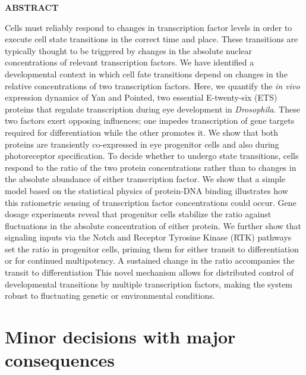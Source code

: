 

\textbf{ABSTRACT}

Cells must reliably respond to changes in transcription factor levels in order to execute cell state transitions in the correct time and place. These transitions are typically thought to be triggered by changes in the absolute nuclear concentrations of relevant transcription factors. We have identified a developmental context in which cell fate transitions depend on changes in the relative concentrations of two transcription factors. Here, we quantify the \emph{in vivo} expression dynamics of Yan and Pointed, two essential E-twenty-six (ETS) proteins that regulate transcription during eye development in \emph{Drosophila}. These two factors exert opposing influences; one impedes transcription of gene targets required for differentiation while the other promotes it. We show that both proteins are transiently co-expressed in eye progenitor cells and also during photoreceptor specification. To decide whether to undergo state transitions, cells respond to the ratio of the two protein concentrations rather than to changes in the absolute abundance of either transcription factor. We show that a simple model based on the statistical physics of protein-DNA binding illustrates how this ratiometric sensing of transcription factor concentrations could occur. Gene dosage experiments reveal that progenitor cells stabilize the ratio against fluctuations in the absolute concentration of either protein. We further show that signaling inputs via the Notch and Receptor Tyrosine Kinase (RTK) pathways set the ratio in progenitor cells, priming them for either transit to differentiation or for continued multipotency. A sustained change in the ratio accompanies the transit to differentiation This novel mechanism allows for distributed control of developmental transitions by multiple transcription factors, making the system robust to fluctuating genetic or environmental conditions.





\section{Minor decisions with major consequences}

